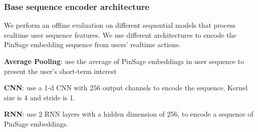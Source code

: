 \begin{table}
\caption{Ablation study of realtime-batch hybrid model}
  \label{tab:hybrid}
\end{table}


\subsubsection{Base sequence encoder architecture}

We perform an offline evaluation on different sequential models that process realtime user sequence features. We use different architectures to encode the PinSage embedding sequence from users' realtime actions.


\textbf{Average Pooling}: use the average of PinSage embeddings in user sequence to present the user’s short-term interest

\textbf{CNN}: use a 1-d CNN with 256 output channels to encode the sequence. Kernel size is 4 and stride is 1. 

\textbf{RNN}: use 2 RNN layers with a hidden dimension of 256, to encode a sequence of PinSage embeddings. 

